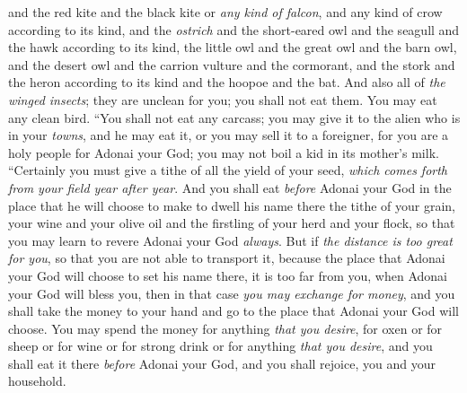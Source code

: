 \begin{biblechapter}
\verse and the red kite and the black kite or \textit{any kind of falcon},
\verse and any kind of crow according to its kind,
\verse and the \textit{ostrich} and the short-eared owl and the seagull and the hawk according to its kind,
\verse the little owl and the great owl and the barn owl,
\verse and the desert owl and the carrion vulture and the cormorant,
\verse and the stork and the heron according to its kind and the hoopoe and the bat.
\verse And also all of \textit{the winged insects}; they are unclean for you; you shall not eat them.
\verse You may eat any clean bird.
\verse “You shall not eat any carcass; you may give it to the alien who is in your \textit{towns}, and he may eat it, or you may sell it to a foreigner, for you are a holy people for Adonai your God; you may not boil a kid in its mother’s milk.
\verse “Certainly you must give a tithe of all the yield of your seed, \textit{which comes forth from your field year after year}.
\verse And you shall eat \textit{before} Adonai your God in the place that he will choose to make to dwell his name there the tithe of your grain, your wine and your olive oil and the firstling of your herd and your flock, so that you may learn to revere Adonai your God \textit{always}.
\verse But if \textit{the distance is too great for you}, so that you are not able to transport it, because the place that Adonai your God will choose to set his name there, it is too far from you, when Adonai your God will bless you,
\verse then in that case \textit{you may exchange for money}, and you shall take the money to your hand and go to the place that Adonai your God will choose.
\verse You may spend the money for anything \textit{that you desire}, for oxen or for sheep or for wine or for strong drink or for anything \textit{that you desire}, and you shall eat it there \textit{before} Adonai your God, and you shall rejoice, you and your household.

\end{biblechapter}
